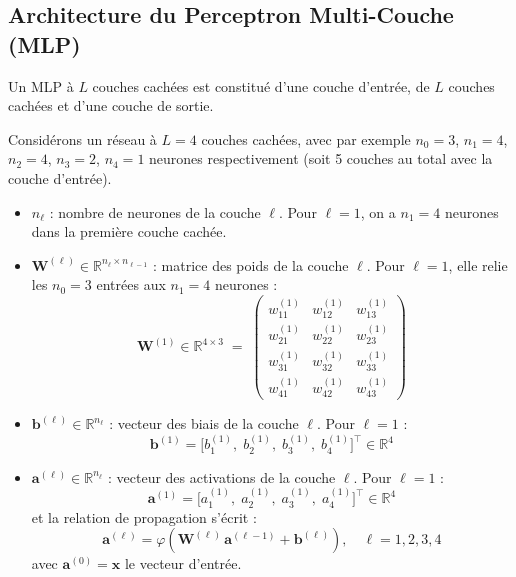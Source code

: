 \subsection{Architecture du Perceptron Multi-Couche (MLP)}

Un MLP à $L$ couches cachées est constitué d'une couche d'entrée, de $L$ couches cachées et d'une couche de sortie.

Considérons un réseau à $L=4$ couches cachées, avec par exemple
$n_0=3$, $n_1=4$, $n_2=4$, $n_3=2$, $n_4=1$ neurones respectivement (soit 5 couches au total avec la couche d'entrée).

\begin{itemize}
	\item $n_\ell$ : nombre de neurones de la couche $\ell$. 
	Pour $\ell=1$, on a $n_1=4$ neurones dans la première couche cachée.
	
	\item $\mathbf{W}^{(\ell)} \in \mathbb{R}^{n_\ell \times n_{\ell-1}}$ :
	matrice des poids de la couche $\ell$. Pour $\ell=1$, elle relie
	les $n_0=3$ entrées aux $n_1=4$ neurones :
	\[
	\mathbf{W}^{(1)} \in \mathbb{R}^{4 \times 3}
	\;=\;
	\begin{pmatrix}
		w^{(1)}_{11} & w^{(1)}_{12} & w^{(1)}_{13} \\
		w^{(1)}_{21} & w^{(1)}_{22} & w^{(1)}_{23} \\
		w^{(1)}_{31} & w^{(1)}_{32} & w^{(1)}_{33} \\
		w^{(1)}_{41} & w^{(1)}_{42} & w^{(1)}_{43}
	\end{pmatrix}
	\]
	
	\item $\mathbf{b}^{(\ell)} \in \mathbb{R}^{n_\ell}$ : vecteur des biais
	de la couche $\ell$. Pour $\ell=1$ :
	\[
	\mathbf{b}^{(1)} =
	\bigl[b^{(1)}_1,\; b^{(1)}_2,\; b^{(1)}_3,\; b^{(1)}_4\bigr]^\top
	\in \mathbb{R}^{4}
	\]
	
	\item $\mathbf{a}^{(\ell)} \in \mathbb{R}^{n_\ell}$ : vecteur des
	activations de la couche $\ell$. Pour $\ell=1$ :
	\[
	\mathbf{a}^{(1)} =
	\bigl[a^{(1)}_1,\; a^{(1)}_2,\; a^{(1)}_3,\; a^{(1)}_4\bigr]^\top
	\in \mathbb{R}^{4}
	\]
	et la relation de propagation s'écrit :
	\[
	\mathbf{a}^{(\ell)} = \varphi\!\left(\mathbf{W}^{(\ell)}\,
	\mathbf{a}^{(\ell-1)} + \mathbf{b}^{(\ell)}\right),
	\quad \ell = 1,2,3,4
	\]
	avec $\mathbf{a}^{(0)} = \mathbf{x}$ le vecteur d'entrée.
	
\end{itemize}

